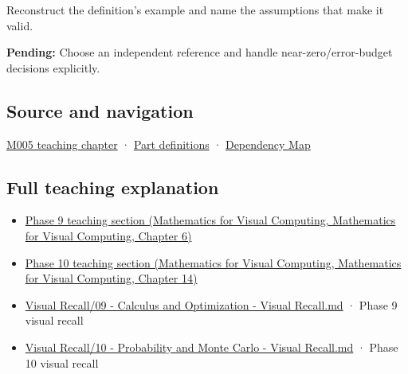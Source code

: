 Reconstruct the definition's example and name the assumptions that make it valid.

\textbf{Pending:} Choose an independent reference and handle near-zero/error-budget decisions explicitly.

\subsection{Source and navigation}\label{appendix-3ae74e89b4e6-source-and-navigation}

\hyperref[01-foundations-i-ch001-when-arithmetic-meets-uncertainty]{M005 teaching chapter} · \hyperref[appendix-fd090d982a15-m005---parts-77-88]{Part definitions} · \hyperref[appendix-4ad47bdd269a]{Dependency Map}

\subsection{Full teaching explanation}\label{appendix-3ae74e89b4e6-full-teaching-explanation}

\begin{itemize}
\tightlist
\item
  \href{../02-Mathematics-for-Visual-Computing/main.pdf\#nameddest=02-foundations-ii-ch022-numerical-differentiation-and-automatic-differentiation}{Phase 9 teaching section (Mathematics for Visual Computing, Mathematics for Visual Computing, Chapter 6)}
\item
  \href{../02-Mathematics-for-Visual-Computing/main.pdf\#nameddest=02-foundations-ii-ch030-inference-and-error-metrics-need-explicit-assumptions}{Phase 10 teaching section (Mathematics for Visual Computing, Mathematics for Visual Computing, Chapter 14)}
\item
  \hyperref[appendix-adf48f5dc5c1]{Visual Recall/09 - Calculus and Optimization - Visual Recall.md} · Phase 9 visual recall
\item
  \hyperref[appendix-cb5af353ef77]{Visual Recall/10 - Probability and Monte Carlo - Visual Recall.md} · Phase 10 visual recall
\end{itemize}
